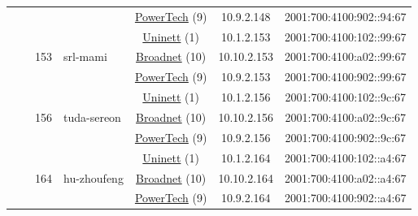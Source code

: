 \begin{small}
\begin{center}
\begin{longtable}{|c|c|c|c|c|c|c|c|}
  &  &  &  & \multicolumn{2}{|c|}{\tiny{\href{http://www.powertech.no}{PowerTech} (9)}} & \tiny{10.9.2.148} & \tiny{2001:700:4100:902::94:67} \\* \cline{3-3}\cline{4-4}\cline{5-5}\cline{6-6}\cline{7-7}\cline{8-8}
  &  & \multirow{3}{*}{\tiny{153}} & \multicolumn{1}{|l|}{\multirow{3}{*}{\tiny{srl-mami}}} & \multicolumn{2}{|c|}{\tiny{\href{https://www.uninett.no}{Uninett} (1)}} & \tiny{10.1.2.153} & \tiny{2001:700:4100:102::99:67} \\* \cline{5-5}\cline{6-6}\cline{7-7}\cline{8-8}
  &  &  &  & \multicolumn{2}{|c|}{\tiny{\href{https://www.broadnet.no}{Broadnet} (10)}} & \tiny{10.10.2.153} & \tiny{2001:700:4100:a02::99:67} \\* \cline{5-5}\cline{6-6}\cline{7-7}\cline{8-8}
  &  &  &  & \multicolumn{2}{|c|}{\tiny{\href{http://www.powertech.no}{PowerTech} (9)}} & \tiny{10.9.2.153} & \tiny{2001:700:4100:902::99:67} \\* \cline{3-3}\cline{4-4}\cline{5-5}\cline{6-6}\cline{7-7}\cline{8-8}
  &  & \multirow{3}{*}{\tiny{156}} & \multicolumn{1}{|l|}{\multirow{3}{*}{\tiny{tuda-sereon}}} & \multicolumn{2}{|c|}{\tiny{\href{https://www.uninett.no}{Uninett} (1)}} & \tiny{10.1.2.156} & \tiny{2001:700:4100:102::9c:67} \\* \cline{5-5}\cline{6-6}\cline{7-7}\cline{8-8}
  &  &  &  & \multicolumn{2}{|c|}{\tiny{\href{https://www.broadnet.no}{Broadnet} (10)}} & \tiny{10.10.2.156} & \tiny{2001:700:4100:a02::9c:67} \\* \cline{5-5}\cline{6-6}\cline{7-7}\cline{8-8}
  &  &  &  & \multicolumn{2}{|c|}{\tiny{\href{http://www.powertech.no}{PowerTech} (9)}} & \tiny{10.9.2.156} & \tiny{2001:700:4100:902::9c:67} \\* \cline{3-3}\cline{4-4}\cline{5-5}\cline{6-6}\cline{7-7}\cline{8-8}
  &  & \multirow{3}{*}{\tiny{164}} & \multicolumn{1}{|l|}{\multirow{3}{*}{\tiny{hu-zhoufeng}}} & \multicolumn{2}{|c|}{\tiny{\href{https://www.uninett.no}{Uninett} (1)}} & \tiny{10.1.2.164} & \tiny{2001:700:4100:102::a4:67} \\* \cline{5-5}\cline{6-6}\cline{7-7}\cline{8-8}
  &  &  &  & \multicolumn{2}{|c|}{\tiny{\href{https://www.broadnet.no}{Broadnet} (10)}} & \tiny{10.10.2.164} & \tiny{2001:700:4100:a02::a4:67} \\* \cline{5-5}\cline{6-6}\cline{7-7}\cline{8-8}
  &  &  &  & \multicolumn{2}{|c|}{\tiny{\href{http://www.powertech.no}{PowerTech} (9)}} & \tiny{10.9.2.164} & \tiny{2001:700:4100:902::a4:67} \\* \cline{3-3}\cline{4-4}\cline{5-5}\cline{6-6}\cline{7-7}\cline{8-8}

\end{longtable}
\end{center}
\end{small}
